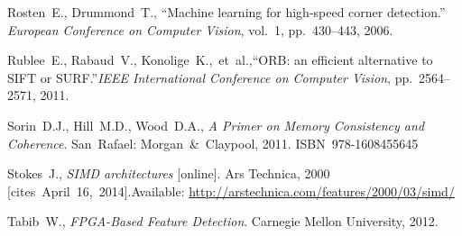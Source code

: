 {\begin{thebibliography}{99}
			Rosten~E., Drummond~T.,
			``Machine learning for high-speed corner detection.''
			\textit{European Conference on Computer Vision}, vol.~1, pp.~430--443,
			2006.
		
			Rublee~E., Rabaud~V., Konolige~K.,~et~al.,\linebreak[1]
			``ORB: an efficient alternative to SIFT or SURF.''\linebreak[1]
			\textit{IEEE International Conference on Computer Vision},
			pp.~2564--2571, 2011.
		
			Sorin~D.J., Hill~M.D., Wood~D.A.,
			\textit{A Primer on Memory Consistency and Coherence}.
			San~Rafael: Morgan~\&~Claypool, 2011. ISBN~978-1608455645
		
			Stokes~J.,
			\textit{SIMD architectures} [online]. Ars Technica, 2000 %
			[cites~April~16,~2014].\linebreak[1]
			Available: \url{http://arstechnica.com/features/2000/03/simd/}
		
			Tabib~W.,
			\textit{FPGA-Based Feature Detection}.
			Carnegie Mellon University, 2012.
		
		
		
		
		
		
		
		

\end{thebibliography}}
